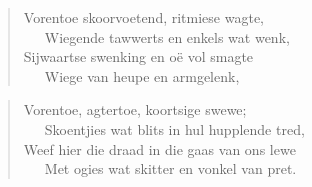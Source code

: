 \begin{verse}
Vorentoe skoorvoetend, ritmiese wagte, \\ 
\ \ \ Wiegende tawwerts en enkels wat wenk, \\ 
Sijwaartse swenking en o\"e vol smagte \\ 
\ \ \ Wiege van heupe en armgelenk, \\ 
\end{verse}

\begin{verse}
Vorentoe, agtertoe, koortsige swewe; \\ 
\ \ \ Skoentjies wat blits in hul hupplende tred, \\ 
Weef hier die draad in die gaas van ons lewe \\ 
\ \ \ Met ogies wat skitter en vonkel van pret. \\ 
\end{verse}